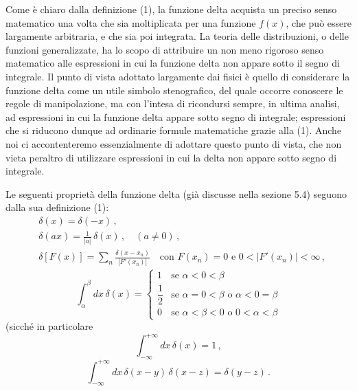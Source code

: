 \documentclass[11pt, a4paper]{book}
\numberwithin{equation}{section}
\begin{document}
Come è chiaro dalla definizione (1), la funzione delta acquista un preciso senso matematico una volta che sia moltiplicata per una funzione $f(x)$, che può essere largamente arbitraria, e che sia poi integrata. La teoria delle distribuzioni, o delle funzioni generalizzate, ha lo scopo di attribuire un non meno rigoroso senso matematico alle espressioni in cui la funzione delta non appare sotto il segno di integrale. Il punto di vista adottato largamente dai fisici è quello di considerare la funzione delta come un utile simbolo stenografico, del quale occorre conoscere le regole di manipolazione, ma con l'intesa di ricondursi sempre, in ultima analisi, ad espressioni in cui la funzione delta appare sotto segno di integrale; espressioni che si riducono dunque ad ordinarie formule matematiche grazie alla (1). Anche noi ci accontenteremo essenzialmente di adottare questo punto di vista, che non vieta peraltro di utilizzare espressioni in cui la delta non appare sotto segno di integrale.

Le seguenti proprietà della funzione delta (già discusse nella sezione 5.4) seguono dalla sua definizione (1):
\begin{align}
&\delta(x) = \delta(-x) \,, \tag{5} \\[4pt]
&\delta(ax) = \frac{1}{|a|}\,\delta(x) \,, \quad (a \neq 0) \,, \tag{6} \\[4pt]
&\delta[F(x)] = \sum_{n} \frac{\delta(x - x_n)}{|F'(x_n)|} \quad \text{con } F(x_n) = 0 \text{ e } 0 < |F'(x_n)| < \infty \,, \tag{7}
\end{align}
\begin{equation}
\int_{\alpha}^{\beta} dx\, \delta(x) =
\begin{cases}
1 & \text{se } \alpha < 0 < \beta \\
\dfrac{1}{2} & \text{se } \alpha = 0 < \beta \text{ o } \alpha < 0 = \beta \\
0 & \text{se } \alpha < \beta < 0 \text{ o } 0 < \alpha < \beta
\end{cases}
\tag{8}
\end{equation}
(sicché in particolare
\begin{equation}
\int_{-\infty}^{+\infty} dx\, \delta(x) = 1 \,, \tag{9}
\end{equation}
\begin{equation}
\int_{-\infty}^{+\infty} dx\, \delta(x-y)\,\delta(x-z) = \delta(y-z) \,. \tag{10}
\end{equation}
\end{document}
